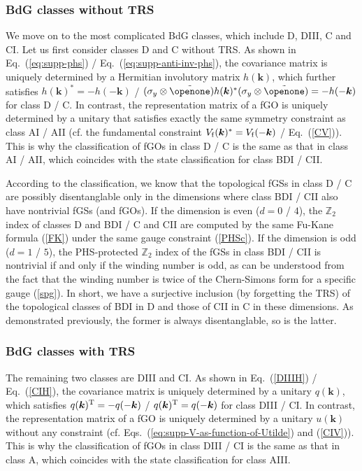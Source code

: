 \documentclass[prl,twocolumn,preprintnumbers,superscriptaddress,amsmath,amssymb]{revtex4-1}
\begin{document}
\subsubsection{BdG classes without TRS}
We move on to the most complicated BdG classes, which include D, DIII, C and CI. Let us first consider classes D and C without TRS. As shown in Eq.~(\ref{eq:supp-phs}) / Eq.~(\ref{eq:supp-anti-inv-phs}), the covariance matrix is uniquely determined by a Hermitian involutory matrix $h(\boldsymbol{k})$, which further satisfies $h(\boldsymbol{k})^*= -h(-\boldsymbol{k})$ / $(\sigma_y\otimes\tilde\openone)h(\boldsymbol{k})^*(\sigma_y\otimes\tilde\openone)= -h(-\boldsymbol{k})$ for class D / C. In contrast, the representation matrix of a fGO is uniquely determined by a unitary that satisfies exactly the same symmetry constraint as class AI / AII (cf. the fundamental constraint $V_{\rm f}(\boldsymbol{k})^*=V_{\rm f}(-\boldsymbol{k})$ / Eq.~(\ref{CV})). This is why the classification of fGOs in class D / C is the same as that in class AI / AII, which coincides with the state classification for class BDI / CII.

According to the classification, we know that the topological fGSs in class D / C are possibly disentanglable only in the dimensions where class BDI / CII also have nontrivial fGSs (and fGOs). If the dimension is even ($d=0$ / $4$), the $\mathbb{Z}_2$ index of classes D and BDI / C and CII are computed by the same Fu-Kane formula (\ref{FK}) under the same gauge constraint (\ref{PHSc}). If the dimension is odd ($d=1$ / $5$), the PHS-protected $\mathbb{Z}_2$ index of the fGSs in class BDI / CII is nontrivial if and only if the winding number is odd, as can be understood from the fact that the winding number is twice of the Chern-Simons form for a specific gauge (\ref{spg}). In short, we have a surjective inclusion (by forgetting the TRS) of the topological classes of BDI in D and those of CII in C in these dimensions. %
As demonstrated previously, the former is always disentanglable, so is the latter.



\subsubsection{BdG classes with TRS}
The remaining two classes are DIII and CI. As shown in Eq.~(\ref{DIIIH}) / Eq.~(\ref{CIH}), the covariance matrix is uniquely determined by a unitary $q(\boldsymbol{k})$, which satisfies $q(\boldsymbol{k})^{\rm T}=-q(-\boldsymbol{k})$ / $q(\boldsymbol{k})^{\rm T}=q(-\boldsymbol{k})$ for class DIII / CI. In contrast, the representation matrix of a fGO is uniquely determined by a unitary $u(\boldsymbol{k})$ without any constraint (cf. Eqs.~(\ref{eq:supp-V-as-function-of-Utilde}) and (\ref{CIV})). This is why the classification of fGOs in class DIII / CI is the same as that in class A, which coincides with the state classification for class AIII.
\end{document}
